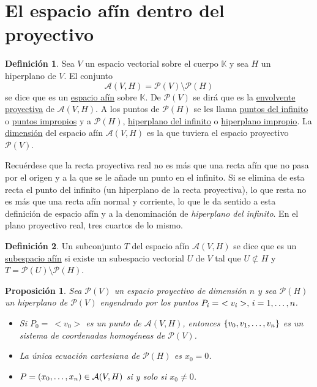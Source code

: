 \documentclass[12pt]{report}
\newtheorem{proposition}{Proposición}[chapter]
\theoremstyle{definition}
\newtheorem{definition}{Definición}[chapter]
\theoremstyle{definition}
\theoremstyle{remark}
\begin{document}
\section{El espacio afín dentro del proyectivo}

\begin{definition}
\label{def1.9.}
Sea $V$ un espacio vectorial sobre el cuerpo $\mathbb{K}$ y sea $H$ un hiperplano de $V$. El conjunto 
\[\mathcal{A}(V,H) = \mathcal{P}(V) \setminus \mathcal{P}(H)\]
se dice que es un \ul{espacio afín} sobre $\mathbb{K}$. De $\mathcal{P}(V)$ se dirá que es la \ul{envolvente proyectiva} de $\mathcal{A}(V,H)$. A los puntos de $\mathcal{P}(H)$ se les llama \ul{puntos del infinito} o \ul{puntos impropios} y a $\mathcal{P}(H)$, \ul{hiperplano del infinito} o \ul{hiperplano impropio}. La \ul{dimensión} del espacio afín $\mathcal{A}(V,H)$ es la que tuviera el espacio proyectivo $\mathcal{P}(V)$.
\end{definition}

Recuérdese que la recta proyectiva real no es más que una recta afín que no pasa por el origen y a la que se le añade un punto en el infinito. Si se elimina de esta recta el punto del infinito (un hiperplano de la recta proyectiva), lo que resta no es más que una recta afín normal y corriente, lo que le da sentido a esta definición de espacio afín y a la denominación de \textit{hiperplano del infinito}. En el plano proyectivo real, tres cuartos de lo mismo.

\begin{definition}
Un subconjunto $T$ del espacio afín $\mathcal{A}(V,H)$ se dice que es un \ul{subespacio afín} si existe un subespacio vectorial $U$ de $V$ tal que $U \not\subset H$ y $T = \mathcal{P}(U) \setminus \mathcal{P}(H)$.
\end{definition}

\begin{proposition}
\label{prop1.3.}
Sea $\mathcal{P}(V)$ un espacio proyectivo de dimensión $n$ y sea $\mathcal{P}(H)$ un hiperplano de $\mathcal{P}(V)$ engendrado por los puntos $P_i = \ <v_i>, \, i = 1,\mathellipsis,n$.
\begin{itemize}
    \item[(i)] Si $P_0 = \ <v_0>$ es un punto de $\mathcal{A}(V,H)$, entonces $\{v_0,v_1,\mathellipsis,v_n\}$ es un sistema de coordenadas homogéneas de $\mathcal{P}(V)$.
    \item[(ii)] La única ecuación cartesiana de $\mathcal{P}(H)$ es $x_0 = 0$.
    \item[(iii)] $P = (x_0,\mathellipsis,x_n) \in \mathcal{A}(V,H)$ si y solo si $x_0 \neq 0$.
\end{itemize}
\end{proposition}
\end{document}
